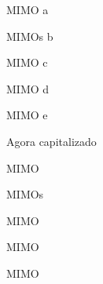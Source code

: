 

\ac{MIMO} a

\acp{MIMO} b

\acs{MIMO} c

\acl{MIMO} d

\acf{MIMO} e

Agora capitalizado

\Ac{MIMO}

\Acp{MIMO}

\Acs{MIMO}

\Acl{MIMO}

\Acf{MIMO}
